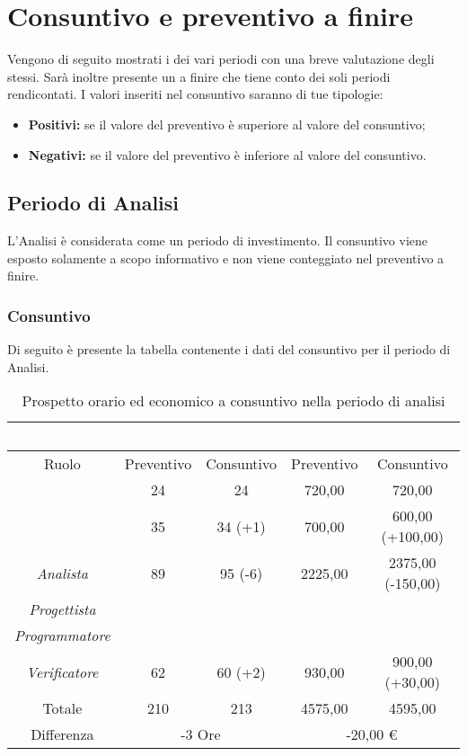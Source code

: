 \section{Consuntivo e preventivo a finire}
\label{consuntivo_preventivo_a_finire}
Vengono di seguito mostrati i  dei vari periodi con una breve valutazione degli stessi. Sarà inoltre presente un  a finire che tiene conto dei soli periodi rendicontati. I valori inseriti nel consuntivo saranno di tue tipologie:
\begin {itemize}
	\item \textbf{Positivi:} se il valore del preventivo è superiore al valore del consuntivo;
	\item \textbf{Negativi:} se il valore del preventivo è inferiore al valore del consuntivo.
\end{itemize}
\subsection{Periodo di Analisi}
L'Analisi è considerata come un periodo di investimento. Il consuntivo viene esposto solamente a scopo informativo e non viene conteggiato nel preventivo a finire.
\subsubsection{Consuntivo}
Di seguito è presente la tabella contenente i dati del consuntivo per il periodo di Analisi.
\begin{table}[H]
	\centering
	\begin{tabular}{|c|c|c|c|c|}
	\rowcolor{darkblue} 
	 	 			&	\multicolumn{2}{c|}{\textcolor{white}{Ore}} 		& 	\multicolumn{2}{c|}{\textcolor{white}{Costo in €}}\\ \hline
			Ruolo			&	Preventivo	&	Consuntivo	&	Preventivo	&	Consuntivo 	\\ \hline
		{\Responsabile}		&	24			&	24			&	720,00		&	720,00  	\\ \hline
		{\Amministratore}	&	35			&	34 (+1)		&	700,00		&	600,00 (+100,00)  \\ \hline
		\textit{Analista}	&	89			&	95 (-6)		&	2225,00		&	2375,00 (-150,00)  \\ \hline
		\textit{Progettista}& 				&	 			& 				&  			\\ \hline
		\textit{Programmatore}& 			& 				& 				&  			\\ \hline
		\textit{Verificatore}&	62			&	60 (+2)		&	930,00		&	900,00 (+30,00) 	\\ \hline
		Totale				&	210			&	213			&	4575,00		&	4595,00  	\\ \hline
		Differenza			& 	\multicolumn{2}{c|}{-3 Ore} 	& 	\multicolumn{2}{c|}{-20,00 €} 	\\ \hline
	\end{tabular}
	\caption{Prospetto orario ed economico a consuntivo nella periodo di analisi}
\end{table}
